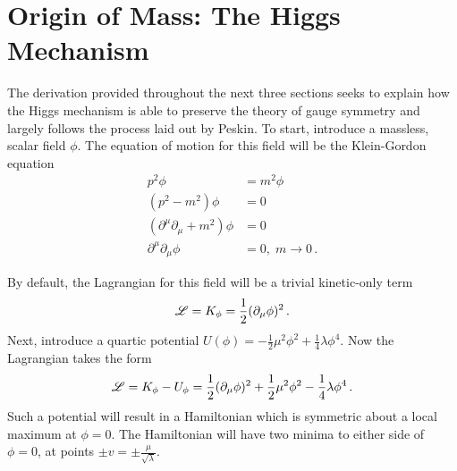 \section{Origin of Mass: The Higgs Mechanism}\label{sec:higgs_mechanism}

    The derivation provided throughout the next three sections seeks to explain
        how the Higgs mechanism is able to preserve the theory of gauge symmetry
        and largely follows the process laid out by Peskin\cite{Peskin_book}.
    To start, introduce a massless, scalar field $\phi$.
    The equation of motion for this field will be the Klein-Gordon equation
    \begin{equation} \begin{split}
        p^2 \phi &= m^2 \phi
        \\(p^2 - m^2) \phi &= 0
        \\(\partial^\mu \partial_\mu + m^2) \phi &= 0
        \\\partial^\mu \partial_\mu \phi &= 0,\; m\to0
        \,.
    \end{split} \end{equation}

    By default, the Lagrangian for this field will be a trivial kinetic-only term
    \begin{equation}
        \mathscr{L} = K_{\phi} = \frac{1}{2} (\partial_{\mu} \phi)^2
        \,.
    \end{equation}
    Next, introduce a quartic potential $U(\phi) = -\frac{1}{2} \mu^2 \phi^2 + \frac{1}{4} \lambda \phi^4$.
    Now the Lagrangian takes the form
    \begin{equation}
        \mathscr{L} = K_{\phi} - U_{\phi} = \frac{1}{2} (\partial_{\mu} \phi)^2 
            +\frac{1}{2} \mu^2 \phi^2 - \frac{1}{4} \lambda \phi^4
        \,.
    \end{equation}
    Such a potential will result in a Hamiltonian which is symmetric about a local maximum at $\phi=0$.
    The Hamiltonian will have two minima to either side of $\phi=0$, at points $\pm v = \pm \frac{\mu}{\sqrt{\lambda}}$.

